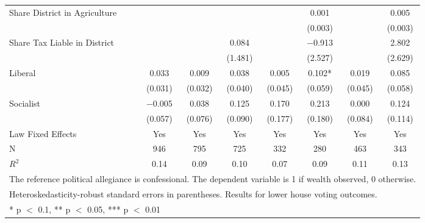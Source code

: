 \begin{table}
\begin{tabular}[t]{lccccccc}
Share District in Agriculture &  &  &  &  & \num{0.001} &  & \num{0.005}\\
 &  &  &  &  & (\num{0.003}) &  & (\num{0.003})\\
Share Tax Liable in District &  &  & \num{0.084} &  & \num{-0.913} &  & \num{2.802}\\
 &  &  & (\num{1.481}) &  & (\num{2.527}) &  & (\num{2.629})\\
Liberal & \num{0.033} & \num{0.009} & \num{0.038} & \num{0.005} & \num{0.102}* & \num{0.019} & \num{0.085}\\
 & (\num{0.031}) & (\num{0.032}) & (\num{0.040}) & (\num{0.045}) & (\num{0.059}) & (\num{0.045}) & (\num{0.058})\\
Socialist & \num{-0.005} & \num{0.038} & \num{0.125} & \num{0.170} & \num{0.213} & \num{0.000} & \num{0.124}\\
 & (\num{0.057}) & (\num{0.076}) & (\num{0.090}) & (\num{0.177}) & (\num{0.180}) & (\num{0.084}) & (\num{0.114})\\
\midrule
Law Fixed Effects & Yes & Yes & Yes & Yes & Yes & Yes & Yes\\
N & \num{946} & \num{795} & \num{725} & \num{332} & \num{280} & \num{463} & \num{343}\\
$R^2$ & \num{0.14} & \num{0.09} & \num{0.10} & \num{0.07} & \num{0.09} & \num{0.11} & \num{0.13}\\
\bottomrule
\multicolumn{8}{l}{\rule{0pt}{1em}The reference political allegiance is confessional. The dependent variable is 1 if wealth observed, 0 otherwise.}\\
\multicolumn{8}{l}{\rule{0pt}{1em}Heteroskedasticity-robust standard errors in parentheses. Results for lower house voting outcomes.}\\
\multicolumn{8}{l}{\rule{0pt}{1em}* p $<$ 0.1, ** p $<$ 0.05, *** p $<$ 0.01}\\
\end{tabular}
\end{table}
